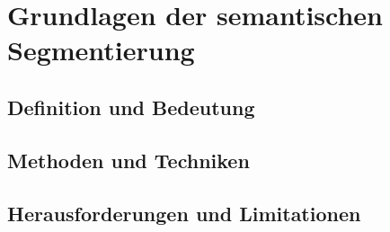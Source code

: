 \chapter{Grundlagen der semantischen Segmentierung}
\section{Definition und Bedeutung}
\section{Methoden und Techniken}
\section{Herausforderungen und Limitationen}